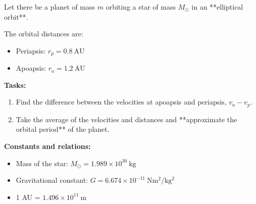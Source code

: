 \documentclass{article}
\begin{document}
\begin{tcolorbox}[colback=green!5!white, colframe=green!75!black, title={Problem}]
Let there be a planet of mass $m$ orbiting a star of mass $M_{\odot}$ in an **elliptical orbit**.  

The orbital distances are:  
\begin{itemize}
    \item Periapsis: $r_p = 0.8~\mathrm{AU}$  
    \item Apoapsis: $r_a = 1.2~\mathrm{AU}$
\end{itemize}
\textbf{Tasks:}  
\begin{enumerate}
    \item Find the difference between the velocities at apoapsis and periapsis, $v_a - v_p$.  
    \item Take the average of the velocities and distances and **approximate the orbital period** of the planet.
\end{enumerate}

\textbf{Constants and relations:}  
\begin{itemize}
    \item Mass of the star: $M_{\odot} = 1.989 \times 10^{30}~\mathrm{kg}$  
    \item Gravitational constant: $G = 6.674 \times 10^{-11}~\mathrm{Nm^2/kg^2}$  
    \item 1 AU = $1.496 \times 10^{11}~\mathrm{m}$
   
   
\end{itemize}

\end{tcolorbox}
\end{document}
